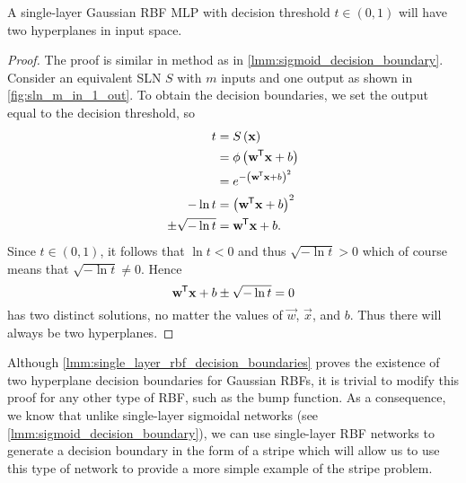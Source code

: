 \begin{lemma}
    \label{lmm:single_layer_rbf_decision_boundaries}
    A single-layer Gaussian RBF MLP with decision threshold $t\in (0,1)$ will have two hyperplanes in input space.
\end{lemma}
\begin{proof}
    The proof is similar in method as in \ref{lmm:sigmoid_decision_boundary}.
    Consider an equivalent SLN $S$ with $m$ inputs and one output as shown in \ref{fig:sln_m_in_1_out}. 
    To obtain the decision boundaries, we set the output equal to the decision threshold, so
    \begin{align*}
        t &= S\left(\mathbf{x}\right) \\
        &= \phi\left(\mathbf{w}^{\mkern-1.5mu\mathsf{T}} \mathbf{x} + b\right) \\
        &= e^{-\left(\mathbf{w}^{\mkern-1.5mu\mathsf{T}} \mathbf{x} + b \right)^2} \\
        -\ln{t} &= \left(\mathbf{w}^{\mkern-1.5mu\mathsf{T}} \mathbf{x} + b \right)^2 \\
        \pm \sqrt{-\ln{t}} &= \mathbf{w}^{\mkern-1.5mu\mathsf{T}} \mathbf{x} + b.
    \end{align*}
    Since $t\in (0,1)$, it follows that $\ln t < 0$ and thus $\sqrt{-\ln{t}} > 0$ which of course means that $\sqrt{-\ln{t}} \neq 0$. 
    Hence
    \begin{equation}
        \label{eq:gaussian_hyperplanes}
        \mathbf{w}^{\mkern-1.5mu\mathsf{T}} \mathbf{x} + b \pm \sqrt{-\ln{t}} = 0
    \end{equation}
    has two distinct solutions, no matter the values of $\vec{w}$, $\vec{x}$, and $b$.
    Thus there will always be two hyperplanes.
\end{proof}
\begin{remark}
    Although \ref{lmm:single_layer_rbf_decision_boundaries} proves the existence of two hyperplane decision boundaries for Gaussian RBFs, it is trivial to modify this proof for any other type of RBF, such as the bump function.
    As a consequence, we know that unlike single-layer sigmoidal networks (see \ref{lmm:sigmoid_decision_boundary}), we can use single-layer RBF networks to generate a decision boundary in the form of a stripe which will allow us to use this type of network to provide a more simple example of the stripe problem.
\end{remark}

